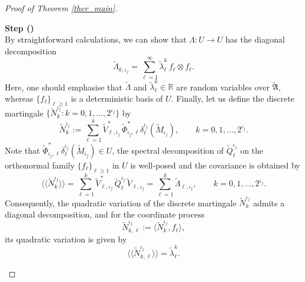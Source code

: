 \documentclass[english,a4paper,11pt]{amsart}
\theoremstyle{plain}
\theoremstyle{definition}
\theoremstyle{remark}
\numberwithin{equation}{section}
\newcounter{lil1}
\newenvironment{step}
{\begin{list} { \bf Step (\Roman{lil1})}
		{ \usecounter{lil1}
			\setlength{\leftmargin}{0.0cm}
			\setlength{\topsep}{0.2cm}
			\setlength{\itemsep}{0.0cm}
			\setlength{\parsep}{0.1cm}
			\setlength{\itemindent}{0.8cm}
			\setlength{\parskip}{0.0cm}}}
	{\end{list}}
\newcounter{lil33}
\newcounter{lil1q}
\newcommand{\RR}{{\mathbb{R}}}
\begin{document}
\begin{proof}[Proof of Theorem \ref{ther_main}]
\begin{step}
$$	$$
	By straightforward calculations, we can show that $\Lambda:U\to U$
	has the diagonal decomposition
	\begin{equation*}
	\widetilde	\Lambda_{k,{{\iota_j}}}=\sum_{\ell=1}^{\infty} \widetilde\lambda_{\ell}^k\,  f_{\ell} \otimes f_{\ell}. \label{8.8}
	\end{equation*}
Here, one should emphasise that $\widetilde{\Lambda}$ and $\widetilde{\lambda}_{\ell}^{k}\in\RR$ are random variables over $\widetilde{\mathfrak{A}}$, whereas $\{f_\ell \}_{\ell\geq1}$ is a deterministic basis of $U$.
%
Finally, let us define the discrete martingale 
\(\{\widetilde{N}_{k}^{\iota_j} : k=0,1,\ldots,2^{\iota_j}\}\) by
{\begin{equation}\label{8.9}
	\widetilde{N}_{k}^{\iota_j}
	:= \sum_{\ell=1}^{k} 
	\widetilde{V}_{\ell,\iota_j}^{*}\, \widetilde{\Phi}_{\iota_j,\ell}^\ast
	\delta_{\ell}^{\iota_j}(\widetilde{M}_{\iota_j}),
	\qquad k=0,1,\ldots,2^{\iota_j}.
\end{equation}Note that $ \widetilde{\Phi}_{\iota_j,\ell}^\ast
\delta_{\ell}^{\iota_j}(\widetilde{M}_{\iota_j})\in U$, the spectral decomposition of $\widetilde{Q}_{\ell}^{\iota_j}$ on the orthonormal family $\{f_\ell\}_{\ell\geq 1} $ in $U$ is well-posed and the covariance is obtained by}
\[
\big\langle\!\big\langle \widetilde{N}_{k}^{\iota_j}
\big\rangle\!\big\rangle
= \sum_{\ell=1}^{k}
\widetilde{V}_{\ell,\iota_j}^{*}\,
\widetilde{Q}_{\ell}^{\iota_j}\,
\widetilde{V}_{\ell,\iota_j}
= \sum_{\ell=1}^{k}
\widetilde{\Lambda}_{\ell,\iota_j},
\qquad k=0,1,\ldots,2^{\iota_j}.
\]
%
Consequently, the quadratic variation of the discrete martingale 
\(\widetilde{N}_{k}^{\iota_j}\) admits a diagonal decomposition, and for the
coordinate process
\[
\widetilde{N}^{\iota_j}_{k,\ell}
:= \langle \widetilde{N}_{k}^{\iota_j}, f_\ell\rangle,
\]
its quadratic variation is given by
\[
\big\langle\!\big\langle 
\widetilde{N}^{\iota_j}_{k,\ell}
\big\rangle\!\big\rangle
= \widetilde{\lambda}_{\ell}^{k}.
\]



	
	

\end{step}
\end{proof}
\end{document}
